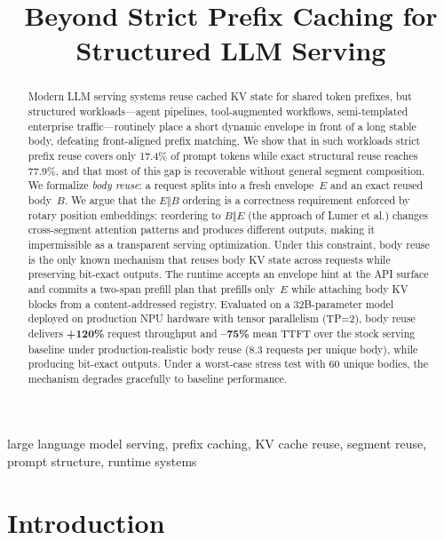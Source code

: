 \documentclass[conference]{IEEEtran}
\begin{document}
\title{Beyond Strict Prefix Caching for Structured LLM Serving}

\author{}

\maketitle

\begin{abstract}
Modern LLM serving systems reuse cached KV state for shared token prefixes, but structured workloads---agent pipelines, tool-augmented workflows, semi-templated enterprise traffic---routinely place a short dynamic envelope in front of a long stable body, defeating front-aligned prefix matching. We show that in such workloads strict prefix reuse covers only 17.4\% of prompt tokens while exact structural reuse reaches 77.9\%, and that most of this gap is recoverable without general segment composition. We formalize \emph{body reuse}: a request splits into a fresh envelope~$E$ and an exact reused body~$B$. We argue that the $E \Vert B$ ordering is a correctness requirement enforced by rotary position embeddings: reordering to $B \Vert E$ (the approach of Lumer et al.) changes cross-segment attention patterns and produces different outputs, making it impermissible as a transparent serving optimization. Under this constraint, body reuse is the only known mechanism that reuses body KV state across requests while preserving bit-exact outputs. The runtime accepts an envelope hint at the API surface and commits a two-span prefill plan that prefills only~$E$ while attaching body KV blocks from a content-addressed registry. Evaluated on a 32B-parameter model deployed on production NPU hardware with tensor parallelism (TP=2), body reuse delivers \textbf{+120\%} request throughput and \textbf{--75\%} mean TTFT over the stock serving baseline under production-realistic body reuse (8.3 requests per unique body), while producing bit-exact outputs. Under a worst-case stress test with 60 unique bodies, the mechanism degrades gracefully to baseline performance.
\end{abstract}

\begin{IEEEkeywords}
large language model serving, prefix caching, KV cache reuse, segment reuse, prompt structure, runtime systems
\end{IEEEkeywords}

\section{Introduction}
\end{document}
